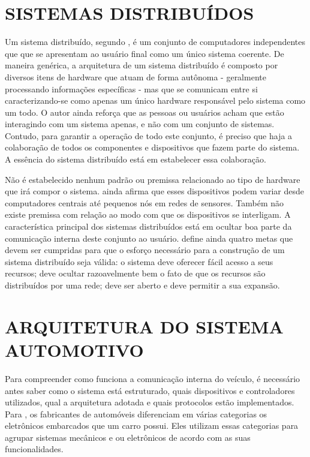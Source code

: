 \section{SISTEMAS DISTRIBUÍDOS}\label{secaosistemasdistribuidos}
Um sistema distribuído, segundo , é um conjunto de computadores independentes que que se apresentam ao usuário final como um único sistema coerente. De maneira genérica, a arquitetura de um sistema distribuído é composto por diversos itens de hardware que atuam de forma autônoma - geralmente processando informações específicas - mas que se comunicam entre si caracterizando-se como apenas um único hardware responsável pelo sistema como um todo. O autor ainda reforça que as pessoas ou usuários acham que estão interagindo com um sistema apenas, e não com um conjunto de sistemas. Contudo, para garantir a operação de todo este conjunto, é preciso que haja a colaboração de todos os componentes e dispositivos que fazem parte do sistema. A essência do sistema distribuído está em estabelecer essa colaboração.

Não é estabelecido nenhum padrão ou premissa relacionado ao tipo de hardware que irá compor o sistema.  ainda afirma que esses dispositivos podem variar desde computadores centrais até pequenos nós em redes de sensores. Também não existe premissa com relação ao modo com que os dispositivos se interligam. A característica principal dos sistemas distribuídos está em ocultar boa parte da comunicação interna deste conjunto ao usuário.  define ainda quatro metas que devem ser cumpridas para que o esforço necessário para a construção de um sistema distribuído seja válida: o sistema deve oferecer fácil acesso a seus recursos; deve ocultar razoavelmente bem o fato de que os recursos são distribuídos por uma rede; deve ser aberto e deve permitir a sua expansão.


\section{ARQUITETURA DO SISTEMA AUTOMOTIVO}
Para compreender como funciona a comunicação interna do veículo, é necessário antes saber como o sistema está estruturado, quais dispositivos e controladores utilizados, qual a arquitetura adotada e quais protocolos estão implementados. Para , os fabricantes de automóveis diferenciam em várias categorias os eletrônicos embarcados que um carro possui. Eles utilizam essas categorias para agrupar sistemas mecânicos e ou eletrônicos de acordo com as suas funcionalidades.

